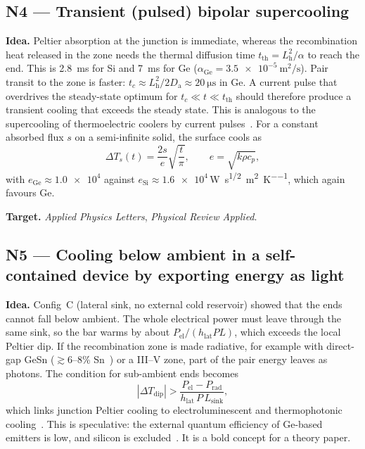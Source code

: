 \documentclass[11pt,a4paper]{article}
\newcommand{\Da}{D_{\mathrm{a}}}
\newcommand{\Lh}{L_{\mathrm{h}}}
\begin{document}
\subsection{N4 --- Transient (pulsed) bipolar supercooling}
\textbf{Idea.} Peltier absorption at the junction is immediate, whereas the recombination heat released in the zone needs the thermal diffusion time $t_{\mathrm{th}}=\Lh^2/\alpha$ to reach the end. This is \SI{2.8}{\milli\second} for Si and \SI{7}{\milli\second} for Ge ($\alpha_{\mathrm{Ge}}=\SI{3.5e-5}{\metre\squared\per\second}$). Pair transit to the zone is faster: $t_c\approx\Lh^2/2\Da\approx\SI{20}{\micro\second}$ in Ge. A current pulse that overdrives the steady-state optimum for $t_c\ll t\ll t_{\mathrm{th}}$ should therefore produce a transient cooling that exceeds the steady state. This is analogous to the supercooling of thermoelectric coolers by current pulses~\cite{snyder2002}. For a constant absorbed flux $s$ on a semi-infinite solid, the surface cools as
\begin{equation}
  \Delta T_s(t)=\frac{2s}{e}\sqrt{\frac{t}{\pi}},\qquad e=\sqrt{k\rho c_p},
\end{equation}
with $e_{\mathrm{Ge}}\approx\num{1.0e4}$ against $e_{\mathrm{Si}}\approx\num{1.6e4}$\,\si{\watt\second\tothe{1/2}\per\metre\squared\per\kelvin}, which again favours Ge.

\textbf{Target.} \emph{Applied Physics Letters}, \emph{Physical Review Applied}.

\subsection{N5 --- Cooling below ambient in a self-contained device by exporting energy as light}
\textbf{Idea.} Config~C (lateral sink, no external cold reservoir) showed that the ends cannot fall below ambient. The whole electrical power must leave through the same sink, so the bar warms by about $P_{\mathrm{el}}/(h_{\mathrm{lat}}PL)$, which exceeds the local Peltier dip. If the recombination zone is made radiative, for example with direct-gap GeSn ($\gtrsim$6--8\% Sn~\cite{gesnled}) or a III--V zone, part of the pair energy leaves as photons. The condition for sub-ambient ends becomes
\begin{equation}
  |\Delta T_{\mathrm{dip}}|>\frac{P_{\mathrm{el}}-P_{\mathrm{rad}}}{h_{\mathrm{lat}}\,P\,L_{\mathrm{sink}}},
\end{equation}
which links junction Peltier cooling to electroluminescent and thermophotonic cooling~\cite{santhanam2012,sadi2020}. This is speculative: the external quantum efficiency of Ge-based emitters is low, and silicon is excluded~\cite{green2001}. It is a bold concept for a theory paper.
\end{document}
